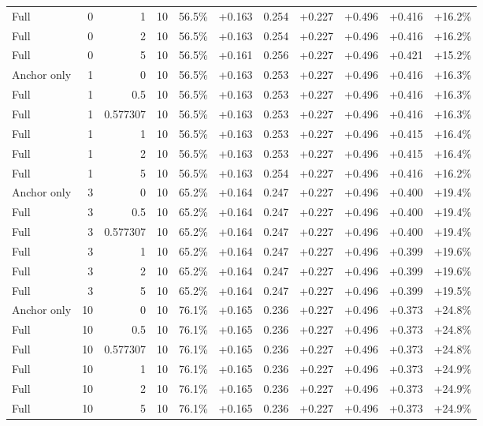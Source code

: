 \begin{table}[htbp]
\begin{tabular}{lrrrccccccc}
Full & 0 & 1 & 10 & 56.5\% & +0.163 & 0.254 & +0.227 & +0.496 & +0.416 & +16.2\% \\
Full & 0 & 2 & 10 & 56.5\% & +0.163 & 0.254 & +0.227 & +0.496 & +0.416 & +16.2\% \\
Full & 0 & 5 & 10 & 56.5\% & +0.161 & 0.256 & +0.227 & +0.496 & +0.421 & +15.2\% \\
Anchor only & 1 & 0 & 10 & 56.5\% & +0.163 & 0.253 & +0.227 & +0.496 & +0.416 & +16.3\% \\
Full & 1 & 0.5 & 10 & 56.5\% & +0.163 & 0.253 & +0.227 & +0.496 & +0.416 & +16.3\% \\
Full & 1 & 0.577307 & 10 & 56.5\% & +0.163 & 0.253 & +0.227 & +0.496 & +0.416 & +16.3\% \\
Full & 1 & 1 & 10 & 56.5\% & +0.163 & 0.253 & +0.227 & +0.496 & +0.415 & +16.4\% \\
Full & 1 & 2 & 10 & 56.5\% & +0.163 & 0.253 & +0.227 & +0.496 & +0.415 & +16.4\% \\
Full & 1 & 5 & 10 & 56.5\% & +0.163 & 0.254 & +0.227 & +0.496 & +0.416 & +16.2\% \\
Anchor only & 3 & 0 & 10 & 65.2\% & +0.164 & 0.247 & +0.227 & +0.496 & +0.400 & +19.4\% \\
Full & 3 & 0.5 & 10 & 65.2\% & +0.164 & 0.247 & +0.227 & +0.496 & +0.400 & +19.4\% \\
Full & 3 & 0.577307 & 10 & 65.2\% & +0.164 & 0.247 & +0.227 & +0.496 & +0.400 & +19.4\% \\
Full & 3 & 1 & 10 & 65.2\% & +0.164 & 0.247 & +0.227 & +0.496 & +0.399 & +19.6\% \\
Full & 3 & 2 & 10 & 65.2\% & +0.164 & 0.247 & +0.227 & +0.496 & +0.399 & +19.6\% \\
Full & 3 & 5 & 10 & 65.2\% & +0.164 & 0.247 & +0.227 & +0.496 & +0.399 & +19.5\% \\
Anchor only & 10 & 0 & 10 & 76.1\% & +0.165 & 0.236 & +0.227 & +0.496 & +0.373 & +24.8\% \\
Full & 10 & 0.5 & 10 & 76.1\% & +0.165 & 0.236 & +0.227 & +0.496 & +0.373 & +24.8\% \\
Full & 10 & 0.577307 & 10 & 76.1\% & +0.165 & 0.236 & +0.227 & +0.496 & +0.373 & +24.8\% \\
Full & 10 & 1 & 10 & 76.1\% & +0.165 & 0.236 & +0.227 & +0.496 & +0.373 & +24.9\% \\
Full & 10 & 2 & 10 & 76.1\% & +0.165 & 0.236 & +0.227 & +0.496 & +0.373 & +24.9\% \\
Full & 10 & 5 & 10 & 76.1\% & +0.165 & 0.236 & +0.227 & +0.496 & +0.373 & +24.9\% \\

\end{tabular}
\end{table}
